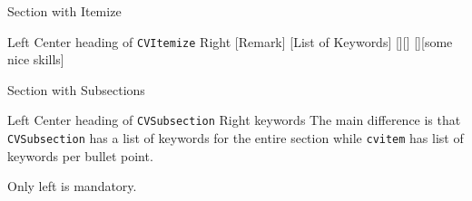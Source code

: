 \documentclass[a4paper]{mcdowellcv}
\begin{document}
	
    \makeheader
    
    \begin{cvsection}{Section with Itemize}
        \begin{cvitemize}
            {Left}
            {Center heading of \texttt{CVItemize}}
            {Right}
                    [Remark]
                    [List of Keywords]
                [][]
                [][some nice skills]
        \end{cvitemize}
    \end{cvsection}

    \begin{cvsection}{Section with Subsections}
        \begin{cvsubsection}
            {Left}
            {Center heading of \texttt{CVSubsection}}
            {Right}
            {keywords}
                The main difference is that \texttt{CVSubsection} has a list of keywords for the entire section while \texttt{cvitem} has list of keywords per bullet point.
        \end{cvsubsection}
        \begin{cvsubsection}
            {Only left is mandatory.}
            {}
            {}
            {}
        \end{cvsubsection}
    \end{cvsection}
\end{document}
